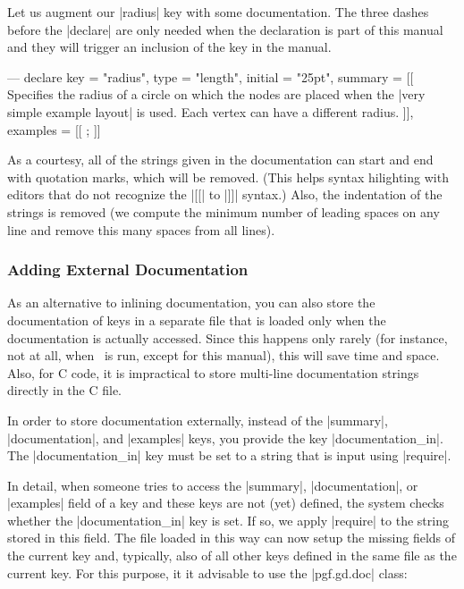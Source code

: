 Let us augment our |radius| key with some documentation. The three
dashes before the |declare| are only needed when the declaration is
part of this manual and they will trigger an inclusion of the key in
the manual.

\begin{codeexample}
--- 
declare {
  key = "radius",
  type = "length",
  initial = "25pt",
  summary = [[
    Specifies the radius of a circle on which the nodes are placed when
    the |very simple example layout| is used. Each vertex can have a
    different radius.
  ]],
  examples = [[
    \tikz {};
  ]]
}
\end{codeexample}

As a courtesy, all of the strings given in the documentation can start
and end with quotation marks, which will be removed. (This helps
syntax hilighting with editors that do not recognize the |[[| to |]]|
syntax.) Also, the indentation of the strings is removed (we compute
the minimum number of leading spaces on any line and remove this many
spaces from all lines).



\subsubsection{Adding External Documentation}
\label{section-gd-documentation-in}

As an alternative to inlining documentation, you can also store the
documentation of keys in a separate file that is loaded only when the
documentation is actually accessed. Since this happens only rarely
(for instance, not at all, when \tikzname\ is run, except for this
manual), this will save time and space. Also, for C code, it is
impractical to store multi-line documentation strings directly in the C
file.

In order to store documentation externally, instead of the |summary|,
|documentation|, and |examples| keys, you provide the key
|documentation_in|. The |documentation_in| key must be set
to a string that is input using |require|.

In detail, when someone tries to access the |summary|, |documentation|, or
|examples| field of a key and these keys are not (yet) defined, the
system checks whether the |documentation_in| key is set. If so, we
apply |require| to the string stored in this field. The file loaded in
this way can now setup the missing fields of the current key and,
typically, also of all other keys defined in the same file as the
current key. For this purpose, it it advisable to use the |pgf.gd.doc|
class:

